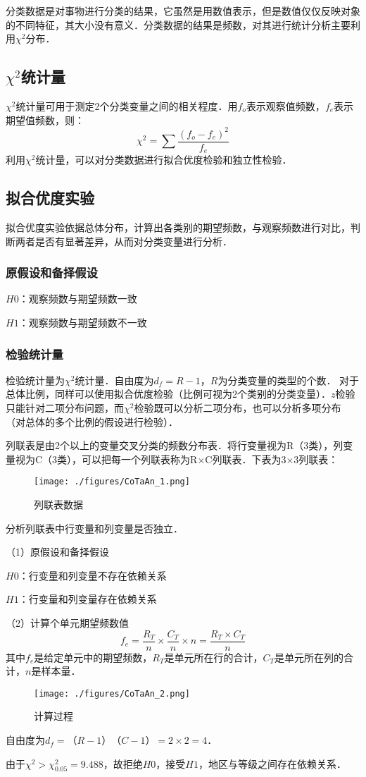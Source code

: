 分类数据是对事物进行分类的结果，它虽然是用数值表示，但是数值仅仅反映对象的不同特征，其大小没有意义．分类数据的结果是频数，对其进行统计分析主要利用$\chi^2$分布．
\subsection{$\chi^2$统计量}
$\chi^2$统计量可用于测定2个分类变量之间的相关程度．用$f_o$表示观察值频数，$f_e$表示期望值频数，则：
\begin{equation}
\chi^2 =  \sum \frac {(f_o-f_e)^2}{f_e}
\end{equation}
利用$\chi^2$统计量，可以对分类数据进行拟合优度检验和独立性检验．
\subsection{拟合优度实验}
拟合优度实验依据总体分布，计算出各类别的期望频数，与观察频数进行对比，判断两者是否有显著差异，从而对分类变量进行分析．
\subsubsection{原假设和备择假设}
$H0$：观察频数与期望频数一致

$H1$：观察频数与期望频数不一致
\subsubsection{检验统计量}
检验统计量为$\chi^2$统计量．自由度为$d_f = R-1$，$R$为分类变量的类型的个数．
对于总体比例，同样可以使用拟合优度检验（比例可视为2个类别的分类变量）．$z$检验只能针对二项分布问题，而$\chi^2$检验既可以分析二项分布，也可以分析多项分布（对总体的多个比例的假设进行检验）．
\begin{example}{}
列联表是由2个以上的变量交叉分类的频数分布表．将行变量视为R（3类），列变量视为C（3类），可以把每一个列联表称为R×C列联表．下表为3×3列联表：
\begin{figure}[ht]
\centering
\texttt{[image: ./figures/CoTaAn\_1.png]}
\caption{列联表数据} \label{CoTaAn_fig1}
\end{figure}
分析列联表中行变量和列变量是否独立．

（1）原假设和备择假设

$H0$：行变量和列变量不存在依赖关系

$H1$：行变量和列变量存在依赖关系

（2）计算个单元期望频数值
\begin{equation}
f_e=\frac {R_T}{n}\times \frac {C_T}{n}\times n =\frac{R_T \times C_T}{n}
\end{equation}
其中$f_e$是给定单元中的期望频数，$R_T$是单元所在行的合计，$C_T$是单元所在列的合计，$n$是样本量．
\begin{figure}[ht]
\centering
\texttt{[image: ./figures/CoTaAn\_2.png]}
\caption{计算过程} \label{CoTaAn_fig2}
\end{figure}
自由度为$d_f=（R-1）（C-1）=2\times2=4$．

由于$\chi^2>\chi^2_{0.05}=9.488$，故拒绝$H0$，接受$H1$，地区与等级之间存在依赖关系．
\end{example}
